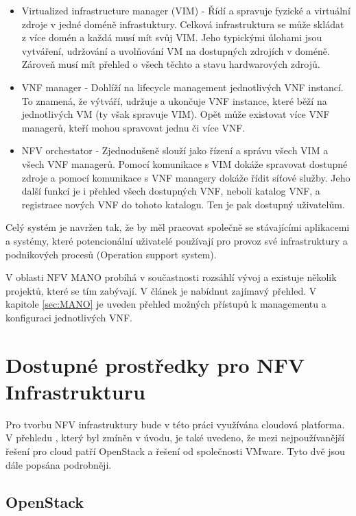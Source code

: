 \begin{itemize}

\item Virtualized infrastructure manager (VIM) - Řídí a spravuje fyzické a virtuální zdroje v jedné doméně infrastuktury. Celková infrastruktura se může skládat z více domén a každá musí mít svůj VIM. Jeho typickými úlohami jsou vytváření, udržování a uvolňování VM na dostupných zdrojích v doméně. Zároveň musí mít přehled o všech těchto a stavu hardwarových zdrojů.

\item VNF manager - Dohlíží na lifecycle management jednotlivých VNF instancí. To znamená, že výtváří, udržuje a ukončuje VNF instance, které běží na jednotlivých VM (ty však spravuje VIM). Opět může existovat více VNF managerů, kteří mohou spravovat jednu či více VNF.

\item NFV orchestator - Zjednodušeně slouží jako řízení a správu všech VIM a všech VNF managerů. Pomocí komunikace s VIM dokáže spravovat dostupné zdroje a pomocí komunikace s VNF managery dokáže řídit síťové služby. Jeho další funkcí je i přehled všech dostupných VNF, neboli katalog VNF, a registrace nových VNF do tohoto katalogu. Ten je pak dostupný uživatelům.
\end{itemize}

Celý systém je navržen tak, že by měl pracovat společně se stávajícími aplikacemi a systémy, které potencionální uživatelé používají pro provoz své infrastruktury a podnikových procesů (Operation support system).

V oblasti NFV MANO probíhá v součastnosti rozsáhlí vývoj a existuje několik projektů, které se tím zabývají. V článek \cite{NFV_orchestration} je nabídnut zajímavý přehled. V kapitole \ref{sec:MANO} je uveden přehled možných přístupů k managementu a konfiguraci jednotlivých VNF.

\section{Dostupné prostředky pro NFV Infrastrukturu} \label{sec:NFVI}

Pro tvorbu NFV infrastruktury bude v této práci využívána cloudová platforma. V přehledu \cite{Cloud_adoption} , který byl zmíněn v úvodu, je také uvedeno, že mezi nejpoužívanější řešení pro cloud patří OpenStack a řešení od společnosti VMware. Tyto dvě jsou dále popsána podrobněji.

\subsection{OpenStack}

